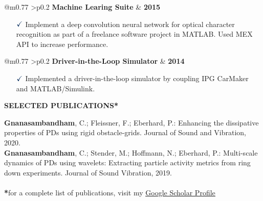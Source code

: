 \documentclass[a4paper,10pt]{article}
\begin{document}
\vspace{0.3cm}
\noindent
\begin{tabular}{ @{\hskip 0pt}m{0.77\textwidth} >{\raggedleft\arraybackslash}p{0.2\textwidth} }
    \noindent\textbf{Machine Learing Suite} & \textbf{2015}
\end{tabular}

{\small
\begin{itemize}
    \item[$\textcolor{highlightcolor}{\checkmark}$]  
        Implement a deep convolution neural network for optical character recognition as part of a freelance software project in MATLAB. Used MEX API to increase performance. 
\end{itemize}
}

\vspace{0.3cm}
\noindent
\begin{tabular}{ @{\hskip 0pt}m{0.77\textwidth} >{\raggedleft\arraybackslash}p{0.2\textwidth} }
    \noindent\textbf{Driver-in-the-Loop Simulator} & \textbf{2014}
\end{tabular}

{\small
\begin{itemize}
    \item[$\textcolor{highlightcolor}{\checkmark}$]  
    Implemented a driver-in-the-loop simulator by coupling IPG CarMaker and MATLAB/Simulink.
\end{itemize}
}

\noindent{\rule{\linewidth}{1.4pt}}
\textbf{SELECTED PUBLICATIONS*}

\vspace{-0.1cm}
\noindent{\rule{\linewidth}{0.01cm}}

{\small 
    \noindent \textbf{Gnanasambandham}, C.; Fleissner, F.; Eberhard, P.: Enhancing the dissipative properties of PDs using rigid obstacle-grids. Journal of Sound and Vibration, 2020.\\
    \noindent \textbf{Gnanasambandham}, C.; Stender, M.; Hoffmann, N.; Eberhard, P.: Multi-scale dynamics of PDs using wavelets: Extracting particle activity metrics from ring down experiments. Journal of Sound Vibration, 2019.\\ \\
    \noindent \textbf{*}for a complete list of publications, visit my \href{https://scholar.google.com/citations?user=azp3ffYAAAAJ&hl=de}{\textcolor{highlightcolor}{\underline{Google Scholar Profile}}} 
}
\end{document}
